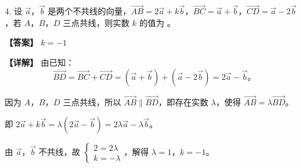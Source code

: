 \documentclass[UTF8,10pt,aspectratio=169]{ctexbeamer}
\begin{document}
	\begin{frame}
		4. 设 $\vec{a}$，$\vec{b}$ 是两个不共线的向量，$\overrightarrow{AB} = 2\vec{a} + k\vec{b}$，$\overrightarrow{BC} = \vec{a} + \vec{b}$，$\overrightarrow{CD} = \vec{a} - 2\vec{b}$，若 $A$，$B$，$D$ 三点共线，则实数 $k$ 的值为 \underline{\hspace{2cm}}。
		
		\pause
		\vspace{0.3cm}
		\textbf{【答案】} $k = -1$
		
		\vspace{0.2cm}
		\textbf{【详解】} 由已知：
		$$\overrightarrow{BD} = \overrightarrow{BC} + \overrightarrow{CD} = (\vec{a} + \vec{b}) + (\vec{a} - 2\vec{b}) = 2\vec{a} - \vec{b}。$$
		
		\vspace{0.1cm}
		因为 $A$，$B$，$D$ 三点共线，所以 $\overrightarrow{AB} \parallel \overrightarrow{BD}$，即存在实数 $\lambda$，使得 $\overrightarrow{AB} = \lambda \overrightarrow{BD}$。
		
		\vspace{0.1cm}
		即 $2\vec{a} + k\vec{b} = \lambda(2\vec{a} - \vec{b}) = 2\lambda\vec{a} - \lambda\vec{b}$。
		
		\vspace{0.1cm}
		由 $\vec{a}$，$\vec{b}$ 不共线，故 $\begin{cases} 2 = 2\lambda \\ k = -\lambda \end{cases}$，解得 $\lambda = 1$，$k = -1$。
	\end{frame}
	
\end{document}
